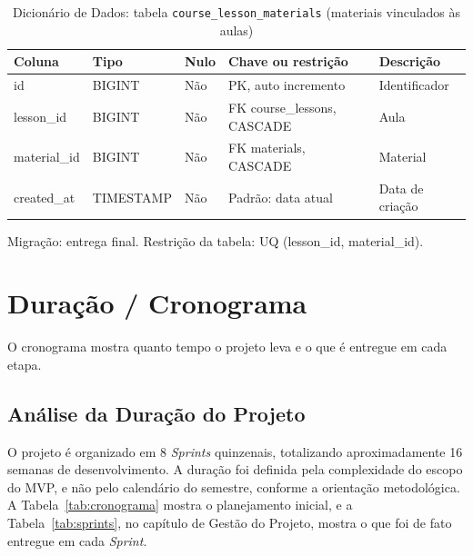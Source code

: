 \begin{table}[H]
\centering
\footnotesize
\caption{Dicionário de Dados: tabela \texttt{course\_\allowbreak{}lesson\_\allowbreak{}materials} (materiais vinculados às aulas)}
\label{tab:dd-course-lesson-materials}
\begin{tabular}{|>{\raggedright\arraybackslash}p{3.0cm}|>{\raggedright\arraybackslash}p{3.2cm}|>{\centering\arraybackslash}p{0.8cm}|>{\raggedright\arraybackslash}p{3.0cm}|>{\raggedright\arraybackslash}p{3.8cm}|}
\hline
\textbf{Coluna} & \textbf{Tipo} & \textbf{Nulo} & \textbf{Chave ou restrição} & \textbf{Descrição} \\
\hline
id & BIGINT & Não & PK, auto incremento & Identificador \\
\hline
lesson\_\allowbreak{}id & BIGINT & Não & FK course\_\allowbreak{}lessons, CASCADE & Aula \\
\hline
material\_\allowbreak{}id & BIGINT & Não & FK materials, CASCADE & Material \\
\hline
created\_\allowbreak{}at & TIMESTAMP & Não & Padrão: data atual & Data de criação \\
\hline
\end{tabular}
\par\footnotesize Migração: entrega final. Restrição da tabela: UQ (lesson\_\allowbreak{}id, material\_\allowbreak{}id).
\end{table}

\section{Duração / Cronograma}

O cronograma mostra quanto tempo o projeto leva e o que é entregue em cada etapa.

\subsection{Análise da Duração do Projeto}

O projeto é organizado em 8 \textit{Sprints} quinzenais, totalizando aproximadamente 16 semanas de desenvolvimento. A duração foi definida pela complexidade do escopo do MVP, e não pelo calendário do semestre, conforme a orientação metodológica. A Tabela~\ref{tab:cronograma} mostra o planejamento inicial, e a Tabela~\ref{tab:sprints}, no capítulo de Gestão do Projeto, mostra o que foi de fato entregue em cada \textit{Sprint}.

